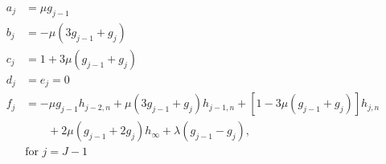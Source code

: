 \documentclass[12pt]{article}
\numberwithin{equation}{section}
\begin{document}
\begin{align}
	a_j &= \mu g_{j-1}
	\\
	b_j &= -  \mu  (3g_{j-1} + g_{j}) 
	\\
	c_j &= 1 +  3\mu  ( g_{j-1}+ g_j )
	\\
	d_j &= e_j = 0 
	\\
	f_j &=-  \mu  g_{j-1} h_{j-2,n}
	+ \mu (3 g_{j-1}+ g_j ) h_{j-1,n}
	+\left[1 - 3 \mu (g_{j-1} + g_j) \right]h_{j,n}
	\nonumber \\ &\qquad
	+ 2\mu ( g_{j-1}+ 2g_j )h_\infty
	+ \lambda(g_{j-1} - g_{j}),
	\\ \nonumber
	&\text{for } j = J-1
\end{align}
\end{document}
